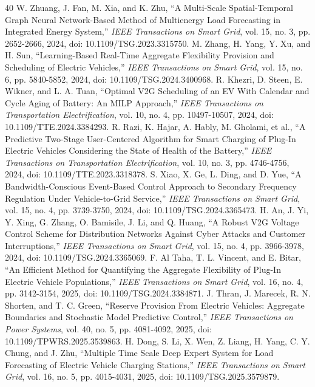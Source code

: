 \documentclass[journal]{IEEEtran}
\begin{document}
\begin{thebibliography}{40}
 W. Zhuang, J. Fan, M. Xia, and K. Zhu, ``A Multi-Scale Spatial-Temporal Graph Neural Network-Based Method of Multienergy Load Forecasting in Integrated Energy System,'' \emph{IEEE Transactions on Smart Grid}, vol. 15, no. 3, pp. 2652-2666, 2024, doi: 10.1109/TSG.2023.3315750.
 M. Zhang, H. Yang, Y. Xu, and H. Sun, ``Learning-Based Real-Time Aggregate Flexibility Provision and Scheduling of Electric Vehicles,'' \emph{IEEE Transactions on Smart Grid}, vol. 15, no. 6, pp. 5840-5852, 2024, doi: 10.1109/TSG.2024.3400968.
 R. Khezri, D. Steen, E. Wikner, and L. A. Tuan, ``Optimal V2G Scheduling of an EV With Calendar and Cycle Aging of Battery: An MILP Approach,'' \emph{IEEE Transactions on Transportation Electrification}, vol. 10, no. 4, pp. 10497-10507, 2024, doi: 10.1109/TTE.2024.3384293.
 R. Razi, K. Hajar, A. Hably, M. Gholami, et al., ``A Predictive Two-Stage User-Centered Algorithm for Smart Charging of Plug-In Electric Vehicles Considering the State of Health of the Battery,'' \emph{IEEE Transactions on Transportation Electrification}, vol. 10, no. 3, pp. 4746-4756, 2024, doi: 10.1109/TTE.2023.3318378.
 S. Xiao, X. Ge, L. Ding, and D. Yue, ``A Bandwidth-Conscious Event-Based Control Approach to Secondary Frequency Regulation Under Vehicle-to-Grid Service,'' \emph{IEEE Transactions on Smart Grid}, vol. 15, no. 4, pp. 3739-3750, 2024, doi: 10.1109/TSG.2024.3365473.
 H. An, J. Yi, Y. Xing, G. Zhang, O. Bamisile, J. Li, and Q. Huang, ``A Robust V2G Voltage Control Scheme for Distribution Networks Against Cyber Attacks and Customer Interruptions,'' \emph{IEEE Transactions on Smart Grid}, vol. 15, no. 4, pp. 3966-3978, 2024, doi: 10.1109/TSG.2024.3365069.
 F. Al Taha, T. L. Vincent, and E. Bitar, ``An Efficient Method for Quantifying the Aggregate Flexibility of Plug-In Electric Vehicle Populations,'' \emph{IEEE Transactions on Smart Grid}, vol. 16, no. 4, pp. 3142-3154, 2025, doi: 10.1109/TSG.2024.3384871.
 J. Thran, J. Marecek, R. N. Shorten, and T. C. Green, ``Reserve Provision From Electric Vehicles: Aggregate Boundaries and Stochastic Model Predictive Control,'' \emph{IEEE Transactions on Power Systems}, vol. 40, no. 5, pp. 4081-4092, 2025, doi: 10.1109/TPWRS.2025.3539863.
 H. Dong, S. Li, X. Wen, Z. Liang, H. Yang, C. Y. Chung, and J. Zhu, ``Multiple Time Scale Deep Expert System for Load Forecasting of Electric Vehicle Charging Stations,'' \emph{IEEE Transactions on Smart Grid}, vol. 16, no. 5, pp. 4015-4031, 2025, doi: 10.1109/TSG.2025.3579879.

\end{thebibliography}
\end{document}
